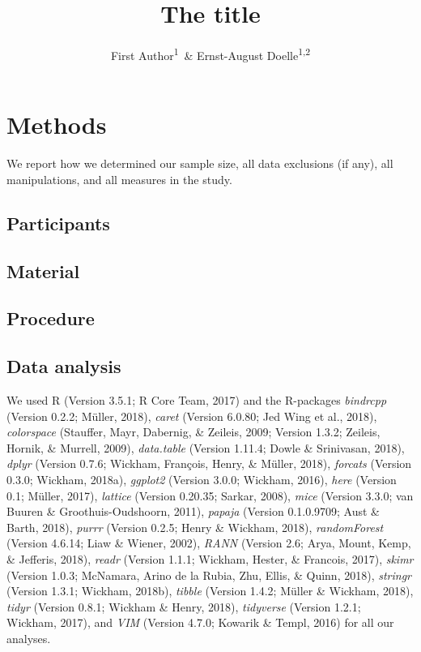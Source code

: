 \documentclass[man]{apa6}
\title{The title}
\author{First Author\textsuperscript{1}~\& Ernst-August Doelle\textsuperscript{1,2}}
\affiliation{
    \vspace{0.5cm}
          \textsuperscript{1} Wilhelm-Wundt-University\\
          \textsuperscript{2} Konstanz Business School  }
\theoremstyle{definition}
\theoremstyle{definition}
\theoremstyle{definition}
\theoremstyle{remark}
\begin{document}
\maketitle

\setcounter{secnumdepth}{0}



\section{Methods}\label{methods}

We report how we determined our sample size, all data exclusions (if
any), all manipulations, and all measures in the study.

\subsection{Participants}\label{participants}

\subsection{Material}\label{material}

\subsection{Procedure}\label{procedure}

\subsection{Data analysis}\label{data-analysis}

We used R (Version 3.5.1; R Core Team, 2017) and the R-packages
\emph{bindrcpp} (Version 0.2.2; Müller, 2018), \emph{caret} (Version
6.0.80; Jed Wing et al., 2018), \emph{colorspace} (Stauffer, Mayr,
Dabernig, \& Zeileis, 2009; Version 1.3.2; Zeileis, Hornik, \& Murrell,
2009), \emph{data.table} (Version 1.11.4; Dowle \& Srinivasan, 2018),
\emph{dplyr} (Version 0.7.6; Wickham, François, Henry, \& Müller, 2018),
\emph{forcats} (Version 0.3.0; Wickham, 2018a), \emph{ggplot2} (Version
3.0.0; Wickham, 2016), \emph{here} (Version 0.1; Müller, 2017),
\emph{lattice} (Version 0.20.35; Sarkar, 2008), \emph{mice} (Version
3.3.0; van Buuren \& Groothuis-Oudshoorn, 2011), \emph{papaja} (Version
0.1.0.9709; Aust \& Barth, 2018), \emph{purrr} (Version 0.2.5; Henry \&
Wickham, 2018), \emph{randomForest} (Version 4.6.14; Liaw \& Wiener,
2002), \emph{RANN} (Version 2.6; Arya, Mount, Kemp, \& Jefferis, 2018),
\emph{readr} (Version 1.1.1; Wickham, Hester, \& Francois, 2017),
\emph{skimr} (Version 1.0.3; McNamara, Arino de la Rubia, Zhu, Ellis, \&
Quinn, 2018), \emph{stringr} (Version 1.3.1; Wickham, 2018b),
\emph{tibble} (Version 1.4.2; Müller \& Wickham, 2018), \emph{tidyr}
(Version 0.8.1; Wickham \& Henry, 2018), \emph{tidyverse} (Version
1.2.1; Wickham, 2017), and \emph{VIM} (Version 4.7.0; Kowarik \& Templ,
2016) for all our analyses.
\end{document}
